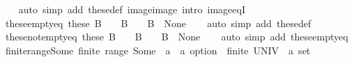 \begin{isabellebody}
%
\isadelimproof
\ \ %
\endisadelimproof
%
\isatagproof
{}\isamarkupfalse%
\ {\isacharparenleft}{\kern0pt}auto\ simp\ add{\isacharcolon}{\kern0pt}\ these{\isacharunderscore}{\kern0pt}def\ image{\isacharunderscore}{\kern0pt}image\ intro{\isacharbang}{\kern0pt}{\isacharcolon}{\kern0pt}\ image{\isacharunderscore}{\kern0pt}eqI{\isacharparenright}{\kern0pt}%
\endisatagproof
{\isafoldproof}%
%
\isadelimproof
\isanewline
%
\endisadelimproof
\isanewline
{}\isamarkupfalse%
\ these{\isacharunderscore}{\kern0pt}empty{\isacharunderscore}{\kern0pt}eq{\isacharcolon}{\kern0pt}\ {\isachardoublequoteopen}these\ B\ {\isacharequal}{\kern0pt}\ {\isacharbraceleft}{\kern0pt}{\isacharbraceright}{\kern0pt}\ {\isasymlongleftrightarrow}\ B\ {\isacharequal}{\kern0pt}\ {\isacharbraceleft}{\kern0pt}{\isacharbraceright}{\kern0pt}\ {\isasymor}\ B\ {\isacharequal}{\kern0pt}\ {\isacharbraceleft}{\kern0pt}None{\isacharbraceright}{\kern0pt}{\isachardoublequoteclose}\isanewline
%
\isadelimproof
\ \ %
\endisadelimproof
%
\isatagproof
{}\isamarkupfalse%
\ {\isacharparenleft}{\kern0pt}auto\ simp\ add{\isacharcolon}{\kern0pt}\ these{\isacharunderscore}{\kern0pt}def{\isacharparenright}{\kern0pt}%
\endisatagproof
{\isafoldproof}%
%
\isadelimproof
\isanewline
%
\endisadelimproof
\isanewline
{}\isamarkupfalse%
\ these{\isacharunderscore}{\kern0pt}not{\isacharunderscore}{\kern0pt}empty{\isacharunderscore}{\kern0pt}eq{\isacharcolon}{\kern0pt}\ {\isachardoublequoteopen}these\ B\ {\isasymnoteq}\ {\isacharbraceleft}{\kern0pt}{\isacharbraceright}{\kern0pt}\ {\isasymlongleftrightarrow}\ B\ {\isasymnoteq}\ {\isacharbraceleft}{\kern0pt}{\isacharbraceright}{\kern0pt}\ {\isasymand}\ B\ {\isasymnoteq}\ {\isacharbraceleft}{\kern0pt}None{\isacharbraceright}{\kern0pt}{\isachardoublequoteclose}\isanewline
%
\isadelimproof
\ \ %
\endisadelimproof
%
\isatagproof
{}\isamarkupfalse%
\ {\isacharparenleft}{\kern0pt}auto\ simp\ add{\isacharcolon}{\kern0pt}\ these{\isacharunderscore}{\kern0pt}empty{\isacharunderscore}{\kern0pt}eq{\isacharparenright}{\kern0pt}%
\endisatagproof
{\isafoldproof}%
%
\isadelimproof
\isanewline
%
\endisadelimproof
\isanewline
{}\isamarkupfalse%
\isanewline
\isanewline
{}\isamarkupfalse%
\ finite{\isacharunderscore}{\kern0pt}range{\isacharunderscore}{\kern0pt}Some{\isacharcolon}{\kern0pt}\ {\isachardoublequoteopen}finite\ {\isacharparenleft}{\kern0pt}range\ {\isacharparenleft}{\kern0pt}Some\ {\isacharcolon}{\kern0pt}{\isacharcolon}{\kern0pt}\ {\isacharprime}{\kern0pt}a\ {\isasymRightarrow}\ {\isacharprime}{\kern0pt}a\ option{\isacharparenright}{\kern0pt}{\isacharparenright}{\kern0pt}\ {\isacharequal}{\kern0pt}\ finite\ {\isacharparenleft}{\kern0pt}UNIV\ {\isacharcolon}{\kern0pt}{\isacharcolon}{\kern0pt}\ {\isacharprime}{\kern0pt}a\ set{\isacharparenright}{\kern0pt}{\isachardoublequoteclose}\isanewline

\end{isabellebody}
